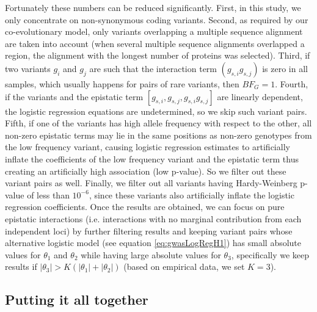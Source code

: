 Fortunately these numbers can be reduced significantly. 
First, in this study, we only concentrate on non-synonymous coding variants. 
Second, as required by our co-evolutionary model, only variants overlapping a multiple sequence alignment are taken into account (when several multiple sequence alignments overlapped a region, the alignment with the longest number of proteins was selected).
Third, if two variants $g_i$ and $g_j$ are such that the interaction term $(g_{s,i} g_{s,j})$ is zero in all samples, which usually happens for pairs of rare variants, then $BF_G = 1$. 
Fourth, if the variants and the epistatic term $[g_{s,i}, g_{s,j}, g_{s,i} g_{s,j}]$ are linearly dependent, the logistic regression equations are undetermined, so we skip such variant pairs. 
Fifth, if one of the variants has high allele frequency with respect to the other, all non-zero epistatic terms may lie in the same positions as non-zero genotypes from the low frequency variant, causing logistic regression estimates to artificially inflate the coefficients of the low frequency variant and the epistatic term thus creating an artificially high association (low p-value). 
So we filter out these variant pairs as well. 
Finally, we filter out all variants having Hardy-Weinberg p-value of less than $10^{-6}$, since these variants also artificially inflate the logistic regression coefficients.  
Once the results are obtained, we can focus on pure epistatic interactions (i.e. interactions with no marginal contribution from each independent loci) by further filtering results and keeping variant pairs whose alternative logistic model (see equation \ref{eq:gwasLogRegH1}) has small absolute values for $\theta_1$ and $\theta_2$ while having large absolute values for $\theta_3$, specifically we keep results if $|\theta_3| > K ( |\theta_1| + |\theta_2| )$ (based on empirical data, we set $K=3$). 

\subsection{Putting it all together}

